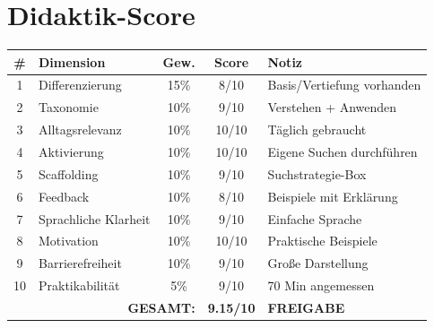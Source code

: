\documentclass[11pt,a4paper]{article}
\begin{document}
\section{Didaktik-Score}

\begin{scorebox}
\begin{tabular}{|c|l|c|c|p{3.5cm}|}
\hline
\# & Dimension & Gew. & Score & Notiz \\
\hline
1 & Differenzierung & 15\% & 8/10 & Basis/Vertiefung vorhanden \\
2 & Taxonomie & 10\% & 9/10 & Verstehen + Anwenden \\
3 & Alltagsrelevanz & 10\% & 10/10 & Täglich gebraucht \\
4 & Aktivierung & 10\% & 10/10 & Eigene Suchen durchführen \\
5 & Scaffolding & 10\% & 9/10 & Suchstrategie-Box \\
6 & Feedback & 10\% & 8/10 & Beispiele mit Erklärung \\
7 & Sprachliche Klarheit & 10\% & 9/10 & Einfache Sprache \\
8 & Motivation & 10\% & 10/10 & Praktische Beispiele \\
9 & Barrierefreiheit & 10\% & 9/10 & Große Darstellung \\
10 & Praktikabilität & 5\% & 9/10 & 70 Min angemessen \\
\hline
\multicolumn{3}{|r|}{\textbf{GESAMT:}} & \textbf{9.15/10} & \textcolor{successgreen}{\textbf{FREIGABE}} \\
\hline
\end{tabular}
\end{scorebox}
\end{document}
